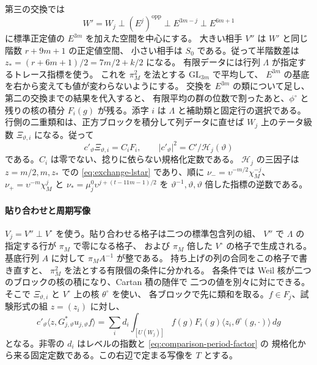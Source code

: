 第三の交換では
\[
 W'=W_j\perp(E^j)^{\mathrm{opp}}\perp E^{3m-j}\perp E^{6m+1}
\]
に標準正定値の \(E^{3m}\) を加えた空間を中心にする。
大きい相手 \(V''\) は \(W'\) と同じ階数 \(r+9m+1\) の正定値空間、
小さい相手は \(S_0\) である。従って半階数差は
\(z_*=(r+6m+1)/2=7m/2+k/2\) になる。
有限データには行列 \(\Lambda\) が指定するトレース指標を使う。
これを \(\pi_M^2\) を法とする \(\mathrm{GL}_{3m}\) で平均して、
\(E^{3m}\) の基底を右から変えても値が変わらないようにする。
交換を \(E^{3m}\) の類について足し、第二の交換までの結果を代入すると、
有限平均の群の位数で割ったあと、\(\phi^\circ\) と残りの核の積分
\(F_i(g)\) が残る。添字 \(i\) は \(\Lambda\) と補助類と固定行の選択である。
行側の二重類和は、正方ブロックを積分して列データに直せば
\(W_j\) 上のテータ級数 \(\Xi_{\vartheta,i}\) になる。従って
\begin{equation}\label{eq:comparison-period-factor}
 c'_\vartheta\Xi_{\vartheta,i}=C_i F_i,\qquad
 |c'_\vartheta|^2=C'/\mathcal H_j(\vartheta)
\end{equation}
である。\(C_i\) は零でない、捻りに依らない規格化定数である。
\(\mathcal H_j\) の三因子は \(z=m/2,m,z_*\) での
\eqref{eq:exchange-lstar} であり、順に
\(\nu_-=\upsilon^{-m/2}\chi_M^{-j}\)、\(\nu_+=\upsilon^{-m}\chi_M^j\) と
\(\nu_*=\mu_j^0\upsilon^{j+(t-11m-1)/2}\) を
\(\vartheta^{-1},\vartheta,\vartheta\) 倍した指標の逆数である。

\paragraph{貼り合わせと周期写像}
\(V_j=V''\perp V^\circ\) を使う。貼り合わせる格子は二つの標準包含列の組、
\(V''\) で \(\Lambda\) の指定する行が \(\pi_M\) で零になる格子、
および \(\pi_M\) 倍した \(V^\circ\) の格子で生成される。
基底行列 \(A\) に対して \(\pi_M A^{-1}\) が整である。
持ち上げの列の合同をこの格子で書き直すと、
\(\pi_M^2\) を法とする有限個の条件に分かれる。
各条件では Weil 核が二つのブロックの核の積になり、Cartan 積の随伴で
二つの値を別々に対にできる。
そこで \(\Xi_{\vartheta,i}\) と \(V^\circ\) 上の核 \(\theta^\circ\) を使い、
各ブロックで先に類和を取る。\(f\in F_j\)、試験形式の組 \(z=(z_i)\) に対し、
\[
 c'_\vartheta\langle z,G_{j,\vartheta}^*u_{j,\vartheta} f\rangle
    =\sum_i d_i\int_{[U(W_j)]}
      f(g)F_i(g)\langle z_i,\theta^\circ(g,\cdot)\rangle\,dg
\]
となる。非零の \(d_i\) はレベルの指数と \eqref{eq:comparison-period-factor} の
規格化から来る固定定数である。この右辺で定まる写像を \(T\) とする。

